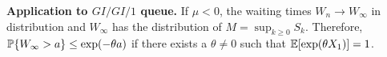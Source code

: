 \documentclass[all-lectures.tex]{subfiles}
\begin{document}
\indent \textbf{Application to $GI/GI/1$ queue.} If $\mu < 0$, the waiting times $W_n \to W_\infty$ in distribution and $W_\infty$ has the distribution of $M = \sup_{k \geq 0}S_k$. Therefore, $\P\{W_\infty > a\} \leq \exp(-\theta a)$ if there exists a $\theta \neq 0$ such that $\E[\exp(\theta X_1)] = 1$.
\end{document}
